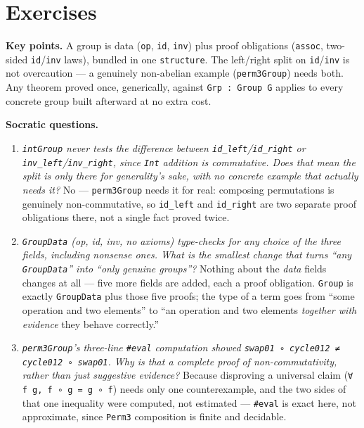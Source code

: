 \section{Exercises}\label{sec:06-groups:07-exercises:1}

\textbf{Key points.} A group is data (\texttt{op}, \texttt{id}, \texttt{inv}) plus proof obligations (\texttt{assoc}, two-sided \texttt{id}/\texttt{inv} laws), bundled in one \texttt{structure}. The left/right split on \texttt{id}/\texttt{inv} is not overcaution --- a genuinely non-abelian example (\texttt{perm3Group}) needs both. Any theorem proved once, generically, against \texttt{Grp : Group G} applies to every concrete group built afterward at no extra cost.

\textbf{Socratic questions.}

\begin{enumerate}
\def\labelenumi{\arabic{enumi}.}
\item
  \emph{\texttt{intGroup} never tests the difference between \texttt{id\_\allowbreak{}left}/\texttt{id\_\allowbreak{}right} or \texttt{inv\_\allowbreak{}left}/\texttt{inv\_\allowbreak{}right}, since \texttt{Int} addition is commutative. Does that mean the split is only there for generality's sake, with no concrete example that actually needs it?} No --- \texttt{perm3Group} needs it for real: composing permutations is genuinely non-commutative, so \texttt{id\_\allowbreak{}left} and \texttt{id\_\allowbreak{}right} are two separate proof obligations there, not a single fact proved twice.
\item
  \emph{\texttt{GroupData} (op, id, inv, no axioms) type-checks for any choice of the three fields, including nonsense ones. What is the smallest change that turns ``any \texttt{GroupData}'' into ``only genuine groups''?} Nothing about the \emph{data} fields changes at all --- five more fields are added, each a proof obligation. \texttt{Group} is exactly \texttt{GroupData} plus those five proofs; the type of a term goes from ``some operation and two elements'' to ``an operation and two elements \emph{together with evidence} they behave correctly.''
\item
  \emph{\texttt{perm3Group}'s three-line \texttt{\#eval} computation showed \texttt{swap01 ∘ cycle012 ≠ cycle012 ∘ swap01}. Why is that a complete proof of non-commutativity, rather than just suggestive evidence?} Because disproving a universal claim (\texttt{∀ f g, f ∘ g = g ∘ f}) needs only one counterexample, and the two sides of that one inequality were computed, not estimated --- \texttt{\#eval} is exact here, not approximate, since \texttt{Perm3} composition is finite and decidable.

\end{enumerate}
